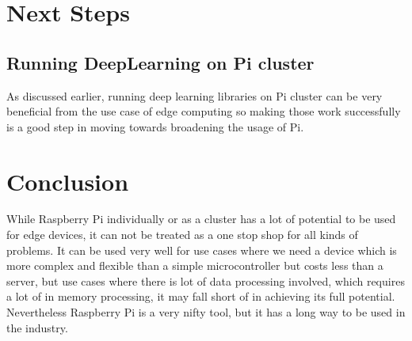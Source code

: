\section{Next Steps}
\subsection{Running DeepLearning on Pi cluster}
As discussed earlier, running deep learning libraries on Pi cluster can be very beneficial from the use case of edge computing so making those work successfully is a good step in moving towards broadening the usage of Pi.
\section{Conclusion}
While Raspberry Pi individually or as a cluster has a lot of potential to be used for edge devices, it can not be treated as a one stop shop for all kinds of problems. It can be used very well for use cases where we need a device which is more complex and flexible than a simple microcontroller but costs less than a server, but use cases where there is lot of data processing involved, which requires a lot of in memory processing, it may fall short of in achieving its full potential. Nevertheless Raspberry Pi is a very nifty tool, but it has a long way to be used in the industry.

 

